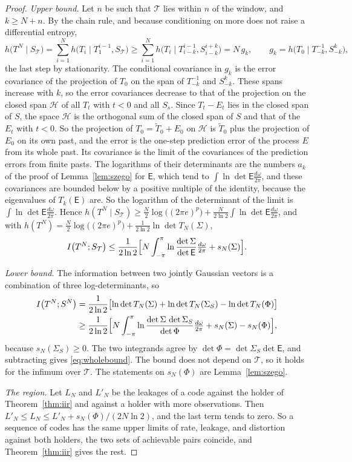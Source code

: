 \documentclass[11pt,onecolumn]{IEEEtran}
\newcommand{\dw}{\tfrac{d\omega}{2\pi}}
\begin{document}
\begin{proof}
\emph{Upper bound.} Let $n$ be such that $\mathcal T$ lies within $n$
of the window, and $k\ge N+n$. By the chain rule, and because
conditioning on more does not raise a differential entropy,
\[
h\bigl(T^N\mid S_{\mathcal T}\bigr)=\sum_{i=1}^Nh\bigl(T_i\mid T_1^{i-1},S_{\mathcal T}\bigr)
\ge\sum_{i=1}^Nh\bigl(T_i\mid T_{i-k}^{i-1},S_{i-k}^{i+k}\bigr)=N\,g_k,
\qquad g_k=h\bigl(T_0\mid T_{-k}^{-1},S_{-k}^{k}\bigr),
\]
the last step by stationarity. The conditional covariance in $g_k$ is
the error covariance of the projection of $T_0$ on the span of
$T_{-k}^{-1}$ and $S_{-k}^{k}$. These spans increase with $k$, so the
error covariances decrease to that of the projection on the closed
span $\mathcal H$ of all $T_t$ with $t<0$ and all $S_s$. Since
$T_t-E_t$ lies in the closed span of $S$, the space $\mathcal H$ is the
orthogonal sum of the closed span of $S$ and that of the $E_t$ with
$t<0$. So the projection of $T_0=\tilde T_0+E_0$ on $\mathcal H$ is
$\tilde T_0$ plus the projection of $E_0$ on its own past, and the
error is the one-step prediction error of the process $E$ from its
whole past. Its covariance is the limit of the covariances of the
prediction errors from finite pasts. The logarithms of their
determinants are the numbers $a_k$ of the proof of
Lemma~\ref{lem:szego} for $\mathsf E$, which tend to
$\int\ln\det\mathsf E\dw$, and these covariances are bounded below by a
positive multiple of the identity, because the eigenvalues of
$T_k(\mathsf E)$ are. So the logarithm of the determinant of the limit
is $\int\ln\det\mathsf E\dw$. Hence
$h(T^N\mid S_{\mathcal T})\ge\tfrac N2\log\bigl((2\pi e)^p\bigr)+\tfrac N{2\ln2}\int\ln\det\mathsf E\dw$,
and with $h(T^N)=\tfrac N2\log\bigl((2\pi e)^p\bigr)+\tfrac1{2\ln2}\ln\det T_N(\Sigma)$,
\[
I\bigl(T^N;S_{\mathcal T}\bigr)\le\frac1{2\ln2}\Bigl[N\int_{-\pi}^{\pi}\ln\frac{\det\Sigma}{\det\mathsf E}\dw+s_N(\Sigma)\Bigr].
\]

\emph{Lower bound.} The information between two jointly Gaussian
vectors is a combination of three log-determinants, so
\begin{align*}
I\bigl(T^N;S^N\bigr)&=\frac1{2\ln2}\bigl[\ln\det T_N(\Sigma)+\ln\det T_N(\Sigma_S)-\ln\det T_N(\Phi)\bigr]\\
&\ge\frac1{2\ln2}\Bigl[N\int_{-\pi}^{\pi}\ln\frac{\det\Sigma\,\det\Sigma_S}{\det\Phi}\dw+s_N(\Sigma)-s_N(\Phi)\Bigr],
\end{align*}
because $s_N(\Sigma_S)\ge0$. The two integrands agree by
$\det\Phi=\det\Sigma_S\det\mathsf E$, and subtracting gives
\eqref{eq:wholebound}. The bound does not depend on $\mathcal T$, so it
holds for the infimum over $\mathcal T$. The statements on $s_N(\Phi)$
are Lemma~\ref{lem:szego}.

\emph{The region.} Let $L_N$ and $L'_N$ be the leakages of a code against
the holder of Theorem~\ref{thm:iir} and against a holder with more
observations. Then $L'_N\le L_N\le L'_N+s_N(\Phi)/(2N\ln2)$, and the last
term tends to zero. So a sequence of codes has the same upper limits of
rate, leakage, and distortion against both holders, the two sets of
achievable pairs coincide, and Theorem~\ref{thm:iir} gives the rest.
\end{proof}
\end{document}
